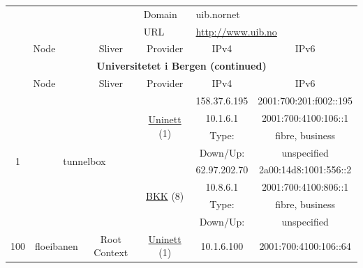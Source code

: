 \begin{small}
\begin{center}
\begin{longtable}{|c|c|c|c|c|c|c|c|}
 \multicolumn{4}{|c|}{} & \multicolumn{1}{|l|}{Domain} & \multicolumn{3}{|l|}{\index{uib.nornet}uib.nornet} \\* \cline{5-5}\cline{6-6}\cline{7-7}\cline{8-8}
 \multicolumn{4}{|c|}{} & \multicolumn{1}{|l|}{URL} & \multicolumn{3}{|l|}{\url{http://www.uib.no}} \\ \hline
 \multicolumn{2}{|p{8em}|}{Node} & \multicolumn{2}{|p{8em}|}{Sliver} & \multicolumn{2}{|p{8em}|}{Provider} & IPv4 & IPv6 \\ \hline
\endfirsthead
\hline
 \multicolumn{8}{|c|}{\textbf{Universitetet i Bergen (continued)}} \\ \hline
 \multicolumn{2}{|p{8em}|}{Node} & \multicolumn{2}{|p{8em}|}{Sliver} & \multicolumn{2}{|p{8em}|}{Provider} & IPv4 & IPv6 \\ \hline
\endhead
 \multirow{8}{*}{\tiny{1}} & \multicolumn{3}{|c|}{\multirow{8}{*}{\tiny{tunnelbox}}} & \multicolumn{2}{|c|}{\multirow{4}{*}{\tiny{\href{https://www.uninett.no}{Uninett} (1)}}} & \tiny{158.37.6.195} & \tiny{2001:700:201:f002::195} \\* \cline{7-7}\cline{8-8}
  & \multicolumn{3}{|c|}{} & \multicolumn{2}{|c|}{} & \tiny{10.1.6.1} & \tiny{2001:700:4100:106::1} \\* \cline{7-7}\cline{8-8}
  & \multicolumn{3}{|c|}{} & \multicolumn{2}{|c|}{} & Type: & fibre, business \\* \cline{7-7}\cline{8-8}
  & \multicolumn{3}{|c|}{} & \multicolumn{2}{|c|}{} & Down/Up:  & unspecified \\* \cline{5-5}\cline{6-6}\cline{7-7}\cline{8-8}
  & \multicolumn{3}{|c|}{} & \multicolumn{2}{|c|}{\multirow{4}{*}{\tiny{\href{http://bkk.no}{BKK} (8)}}} & \tiny{62.97.202.70} & \tiny{2a00:14d8:1001:556::2} \\* \cline{7-7}\cline{8-8}
  & \multicolumn{3}{|c|}{} & \multicolumn{2}{|c|}{} & \tiny{10.8.6.1} & \tiny{2001:700:4100:806::1} \\* \cline{7-7}\cline{8-8}
  & \multicolumn{3}{|c|}{} & \multicolumn{2}{|c|}{} & Type: & fibre, business \\* \cline{7-7}\cline{8-8}
  & \multicolumn{3}{|c|}{} & \multicolumn{2}{|c|}{} & Down/Up:  & unspecified \\ \hline
 \multirow{22}{*}{\tiny{100}} & \multicolumn{1}{|l|}{\multirow{22}{*}{\tiny{floeibanen}}} & \multicolumn{2}{|c|}{\multirow{2}{*}{\tiny{Root Context}}} & \multicolumn{2}{|c|}{\tiny{\href{https://www.uninett.no}{Uninett} (1)}} & \tiny{10.1.6.100} & \tiny{2001:700:4100:106::64} \\* \cline{5-5}\cline{6-6}\cline{7-7}\cline{8-8}

\end{longtable}
\end{center}
\end{small}
